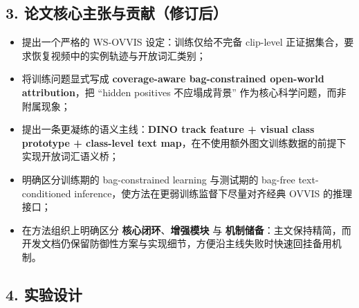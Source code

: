 \documentclass[UTF8]{ctexart}
\begin{document}
\par\noindent\hrulefill\par

\subsection*{3. 论文核心主张与贡献（修订后）}
\begin{itemize}
\item 提出一个严格的 WS-OVVIS 设定：训练仅给不完备 clip-level 正证据集合，要求恢复视频中的实例轨迹与开放词汇类别；
\item 将训练问题显式写成 \textbf{coverage-aware bag-constrained open-world attribution}，把 ``hidden positives 不应塌成背景'' 作为核心科学问题，而非附属现象；
\item 提出一条更凝练的语义主线：\textbf{DINO track feature + visual class prototype + class-level text map}，在不使用额外图文训练数据的前提下实现开放词汇语义桥；
\item 明确区分训练期的 bag-constrained learning 与测试期的 bag-free text-conditioned inference，使方法在更弱训练监督下尽量对齐经典 OVVIS 的推理接口；
\item 在方法组织上明确区分 \textbf{核心闭环}、\textbf{增强模块} 与 \textbf{机制储备}：主文保持精简，而开发文档仍保留防御性方案与实现细节，方便沿主线失败时快速回挂备用机制。
\end{itemize}

\par\noindent\hrulefill\par

\subsection*{4. 实验设计}
\end{document}
